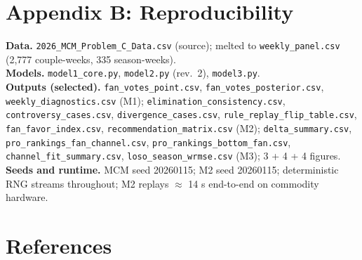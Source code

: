 \documentclass{article}
\begin{document}
\section*{Appendix B: Reproducibility}

\textbf{Data.} \texttt{2026\_MCM\_Problem\_C\_Data.csv} (source); melted to \texttt{weekly\_panel.csv} (2{,}777 couple-weeks, 335 season-weeks). \\
\textbf{Models.} \texttt{model1\_core.py}, \texttt{model2.py} (rev.~2), \texttt{model3.py}. \\
\textbf{Outputs (selected).} \texttt{fan\_votes\_point.csv}, \texttt{fan\_votes\_posterior.csv}, \texttt{weekly\_diagnostics.csv} (M1); \texttt{elimination\_consistency.csv}, \texttt{controversy\_cases.csv}, \texttt{divergence\_cases.csv}, \texttt{rule\_replay\_flip\_table.csv}, \texttt{fan\_favor\_index.csv}, \texttt{recommendation\_matrix.csv} (M2); \texttt{delta\_summary.csv}, \texttt{pro\_rankings\_fan\_channel.csv}, \texttt{pro\_rankings\_bottom\_fan.csv}, \texttt{channel\_fit\_summary.csv}, \texttt{loso\_season\_wrmse.csv} (M3); 3 + 4 + 4 figures. \\
\textbf{Seeds and runtime.} MCM seed 20260115; M2 seed 20260115; deterministic RNG streams throughout; M2 replays $\approx$ 14 s end-to-end on commodity hardware.

\section*{References}
\end{document}
